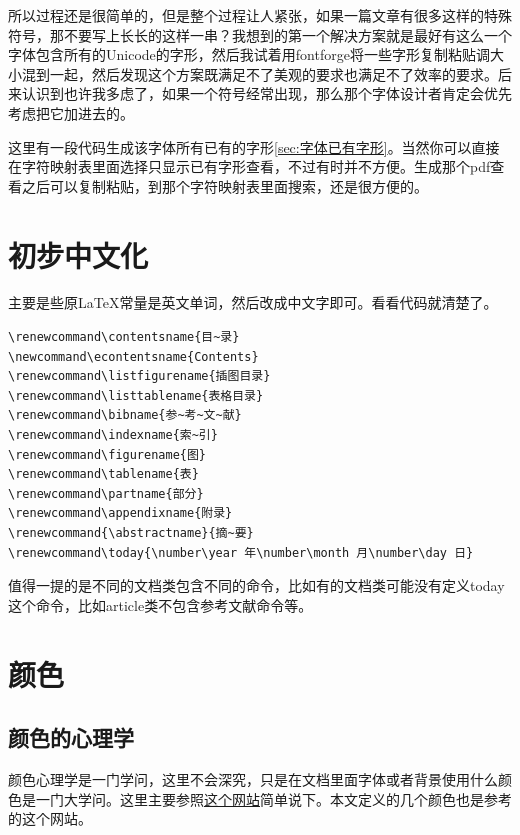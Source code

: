 \documentclass[12pt,oneside]{book}
\begin{document}
\begin{common-format}
\begin{flushright}
\begin{notecard}[olive!30]{20em}
所以过程还是很简单的，但是整个过程让人紧张，如果一篇文章有很多这样的特殊符号，那不要写上长长的这样一串？我想到的第一个解决方案就是最好有这么一个字体包含所有的Unicode的字形，然后我试着用fontforge将一些字形复制粘贴调大小混到一起，然后发现这个方案既满足不了美观的要求也满足不了效率的要求。后来认识到也许我多虑了，如果一个符号经常出现，那么那个字体设计者肯定会优先考虑把它加进去的。
\end{notecard}
\end{flushright}


这里有一段代码生成该字体所有已有的字形\ref{sec:字体已有字形}。当然你可以直接在字符映射表里面选择只显示已有字形查看，不过有时并不方便。生成那个pdf查看之后可以复制粘贴，到那个字符映射表里面搜索，还是很方便的。


\section{初步中文化}
主要是些原\LaTeX 常量是英文单词，然后改成中文字即可。看看代码就清楚了。
\begin{Verbatim}
\renewcommand\contentsname{目~录}
\newcommand\econtentsname{Contents}
\renewcommand\listfigurename{插图目录}
\renewcommand\listtablename{表格目录}
\renewcommand\bibname{参~考~文~献}
\renewcommand\indexname{索~引}
\renewcommand\figurename{图}
\renewcommand\tablename{表}
\renewcommand\partname{部分}
\renewcommand\appendixname{附录}
\renewcommand{\abstractname}{摘~要}
\renewcommand\today{\number\year 年\number\month 月\number\day 日}
\end{Verbatim}

值得一提的是不同的文档类包含不同的命令，比如有的文档类可能没有定义today这个命令，比如article类不包含参考文献命令等。



\section{颜色}
\label{sec:颜色}
\subsection{颜色的心理学}
颜色心理学是一门学问，这里不会深究，只是在文档里面字体或者背景使用什么颜色是一门大学问。这里主要参照\href{http://www.jb51.net/article/8216.htm}{这个网站}简单说下。本文定义的几个颜色也是参考的这个网站。


\end{common-format}
\end{document}
